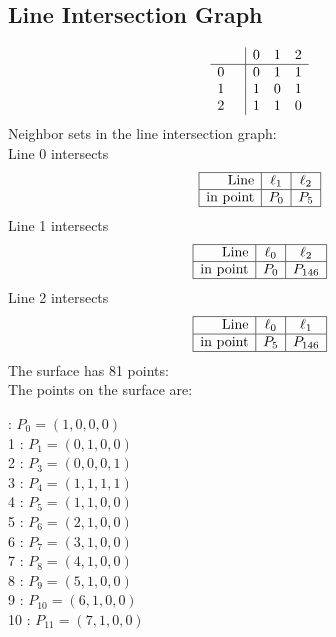 \documentclass{article}
\begin{document}
{\subsection*{Line Intersection Graph}
{\arraycolsep=1pt
$$
\begin{array}{rr|*{3}r}
 &  & 0 & 1 & 2\\
\hline
0 &  & 0 & 1 & 1\\
1 &  & 1 & 0 & 1\\
2 &  & 1 & 1 & 0\\
\end{array}
$$
}%
Neighbor sets in the line intersection graph:\\
Line 0 intersects 
$$
\begin{array}{|r*{2}{|c}|}
\hline
\mbox{Line}  & \ell_{1} & \ell_{2}\\
\hline
\mbox{in point}  & P_{0} & P_{5}\\
\hline
\end{array}
$$
Line 1 intersects 
$$
\begin{array}{|r*{2}{|c}|}
\hline
\mbox{Line}  & \ell_{0} & \ell_{2}\\
\hline
\mbox{in point}  & P_{0} & P_{146}\\
\hline
\end{array}
$$
Line 2 intersects 
$$
\begin{array}{|r*{2}{|c}|}
\hline
\mbox{Line}  & \ell_{0} & \ell_{1}\\
\hline
\mbox{in point}  & P_{5} & P_{146}\\
\hline
\end{array}
$$
The surface has 81 points:\\
The points on the surface are:\\
\begin{multicols}{3}
 : $P_{0}=( 1, 0, 0, 0 )$\\
1 : $P_{1}=( 0, 1, 0, 0 )$\\
2 : $P_{3}=( 0, 0, 0, 1 )$\\
3 : $P_{4}=( 1, 1, 1, 1 )$\\
4 : $P_{5}=( 1, 1, 0, 0 )$\\
5 : $P_{6}=( 2, 1, 0, 0 )$\\
6 : $P_{7}=( 3, 1, 0, 0 )$\\
7 : $P_{8}=( 4, 1, 0, 0 )$\\
8 : $P_{9}=( 5, 1, 0, 0 )$\\
9 : $P_{10}=( 6, 1, 0, 0 )$\\
10 : $P_{11}=( 7, 1, 0, 0 )$\\

\end{multicols}}
\end{document}
